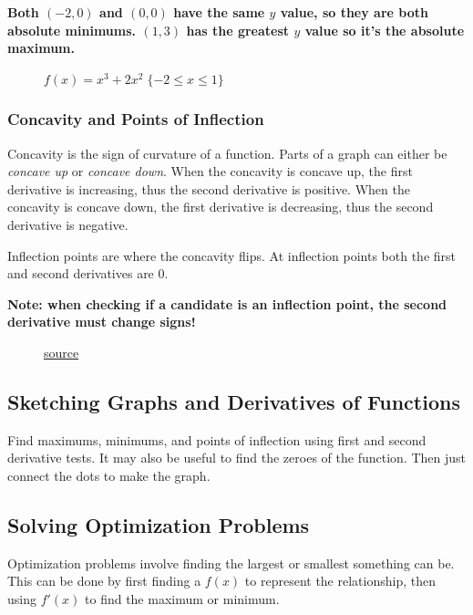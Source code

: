\documentclass[12pt]{article}
\begin{document}
\noindent \textbf{Both $(-2, 0)$ and $(0, 0)$ have the same $y$ value, so they are both absolute minimums. $(1, 3)$ has the greatest $y$ value so it's the absolute maximum.}
\begin{figure}[H]
    \begin{center}
        \caption{$f(x) = x^3 + 2x^2 \; \{-2 \le x \le 1 \}$}
        \label{fig:absextremaclosed}
    \end{center}
\end{figure}

\subsubsection{Concavity and Points of Inflection}
Concavity is the sign of curvature of a function. Parts of a graph can either be \textit{concave up} or \textit{concave down}. When the concavity is concave up, the first derivative is increasing, thus the second derivative is positive. When the concavity is concave down, the first derivative is decreasing, thus the second derivative is negative.

Inflection points are where the concavity flips. At inflection points both the first and second derivatives are $0$.

\noindent \textbf{Note: when checking if a candidate is an inflection point, the second derivative must change signs!}

\begin{figure}[H]
    \begin{center}
        \caption{\href{https://www.khanacademy.org/math/ap-calculus-ab/ab-diff-analytical-applications-new/ab-5-6b/a/review-analyzing-the-second-derivative-to-find-inflection-points}{source}}
        \label{fig:concavityinflection}
    \end{center}
\end{figure}

\subsection{Sketching Graphs and Derivatives of Functions} %
Find maximums, minimums, and points of inflection using first and second derivative tests. It may also be useful to find the zeroes of the function. Then just connect the dots to make the graph.

\subsection{Solving Optimization Problems}
Optimization problems involve finding the largest or smallest something can be. This can be done by first finding a $f(x)$ to represent the relationship, then using $f'(x)$ to find the maximum or minimum.
\end{document}
